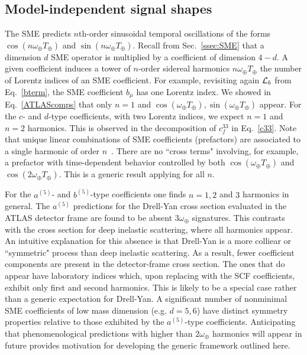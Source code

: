 \subsection{Model-independent signal shapes}
\label{sec:generic_models}

The SME predicts $n$th-order sinusoidal temporal oscillations of the forms
$\cos(n\omega_\oplus T_\oplus)$ and $\sin(n\omega_\oplus T_\oplus)$. Recall
from Sec.~\ref{ssec:SME} that a dimension $d$ SME operator is multiplied
by a coefficient of dimension $4-d$. A given coefficient induces a tower of 
$n$-order sidereal harmonics $n\omega_\oplus T_\oplus$ 
the number of Lorentz indices of an SME coefficient. 
For example, revisiting again ${\cal L}_b$ from Eq.~\eqref{bterm},
the SME coefficient $b_\mu$ has one Lorentz index. We showed 
in Eq.~\eqref{ATLAScomps} that only $n=1$ and 
$\cos(\omega_\oplus T_\oplus), \sin(\omega_\oplus T_\oplus)$ appear. 
For the $c$- and $d$-type coefficients, with two Lorentz indices, 
we expect $n=1$ and $n=2$ harmonics. This is observed in the 
decomposition of $c_f^{33}$ in Eq.~\eqref{c33}. 
Note that unique linear combinations of SME coefficients (prefactors) are
associated to a single harmonic of order $n$~\cite{Kostelecky:2009zp}.
There are no ``cross terms"
involving, for example, a prefactor with time-dependent
behavior controlled by both $\cos(\omega_\oplus T_\oplus)$ 
and $\cos(2\omega_\oplus T_\oplus)$. This is a generic
result applying for all $n$.

For the $a^{(5)}$- and $b^{(5)}$-type coefficients 
one finds $n=1, 2$ and $3$ harmonics in general.
The $a^{(5)}$ predictions for the Drell-Yan cross section
evaluated in the ATLAS detector frame are found to be absent 
$3\omega_\oplus$ signatures. This contrasts with 
the cross section for deep inelastic scattering, 
where all harmonics appear.
An intuitive explanation for this 
absence is that Drell-Yan is
a more colliear or ``symmetric" process 
than deep inelastic scattering.
As a result, fewer coefficient components 
are present in the detector-frame
cross section. The ones that do appear have 
laboratory indices which, upon replacing with the SCF coefficients,
exhibit only first and second harmonics.
This is likely to be a special case
rather than a generic expectation for Drell-Yan.
A significant number of nonminimal 
SME coefficients of low mass 
dimension (e.g. $d=5,6$) have distinct
symmetry properties relative to those exhibited by
the $a^{(5)}$-type coefficients. 
Anticipating that phenomenological predictions
with higher than $2\omega_\oplus$ harmonics
will appear in future provides motivation 
for developing the generic framework outlined here.

